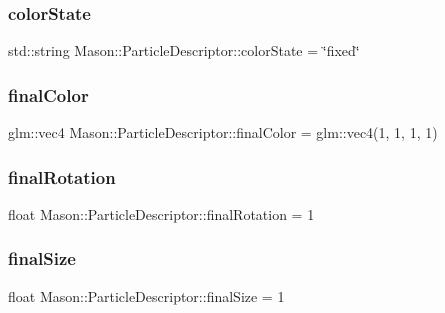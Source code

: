 \subsubsection{\texorpdfstring{color\+State}{colorState}}
{\footnotesize\ttfamily std\+::string Mason\+::\+Particle\+Descriptor\+::color\+State = \char`\"{}fixed\char`\"{}}

\hypertarget{class_mason_1_1_particle_descriptor_a2b01be3725b46d1f4ef7a6775347be66}{}\label{class_mason_1_1_particle_descriptor_a2b01be3725b46d1f4ef7a6775347be66} 
\subsubsection{\texorpdfstring{final\+Color}{finalColor}}
{\footnotesize\ttfamily glm\+::vec4 Mason\+::\+Particle\+Descriptor\+::final\+Color = glm\+::vec4(1, 1, 1, 1)}

\hypertarget{class_mason_1_1_particle_descriptor_ac588e3cd99709ae248547649b4a6643b}{}\label{class_mason_1_1_particle_descriptor_ac588e3cd99709ae248547649b4a6643b} 
\subsubsection{\texorpdfstring{final\+Rotation}{finalRotation}}
{\footnotesize\ttfamily float Mason\+::\+Particle\+Descriptor\+::final\+Rotation = 1}

\hypertarget{class_mason_1_1_particle_descriptor_ad865ce5734085951e7c1ec384389ca4b}{}\label{class_mason_1_1_particle_descriptor_ad865ce5734085951e7c1ec384389ca4b} 
\subsubsection{\texorpdfstring{final\+Size}{finalSize}}
{\footnotesize\ttfamily float Mason\+::\+Particle\+Descriptor\+::final\+Size = 1}

\hypertarget{class_mason_1_1_particle_descriptor_a4e686866e2431ae666800ead5d1638c4}{}\label{class_mason_1_1_particle_descriptor_a4e686866e2431ae666800ead5d1638c4} 
